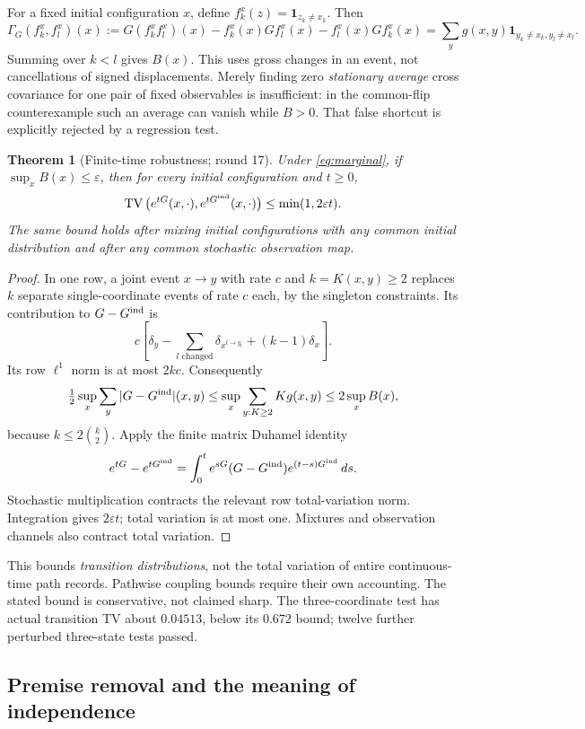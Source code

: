 \documentclass[11pt,a4paper]{article}
\newtheorem{theorem}{Theorem}
\newcommand{\TV}{\operatorname{TV}}
\begin{document}
For a fixed initial configuration $x$, define
$f_k^x(z)=\mathbf1_{z_k\ne x_k}$. Then
\[
 \Gamma_G(f_k^x,f_l^x)(x)
 :=G(f_k^xf_l^x)(x)-f_k^x(x)Gf_l^x(x)-f_l^x(x)Gf_k^x(x)
 =\sum_y g(x,y)\mathbf1_{y_k\ne x_k,y_l\ne x_l}.
\]
Summing over $k<l$ gives $B(x)$. This uses gross changes in an event, not
cancellations of signed displacements. Merely finding zero \emph{stationary
average} cross covariance for one pair of fixed observables is insufficient:
in the common-flip counterexample such an average can vanish while $B>0$.
That false shortcut is explicitly rejected by a regression test.

\begin{theorem}[Finite-time robustness; round 17]
Under \eqref{eq:marginal}, if $\sup_xB(x)\le\varepsilon$, then for every
initial configuration and $t\ge0$,
\[
 \TV\big(e^{tG}(x,\cdot),e^{tG^{\rm ind}}(x,\cdot)\big)
 \le\min(1,2\varepsilon t).
\]
The same bound holds after mixing initial configurations with any common
initial distribution and after any common stochastic observation map.
\end{theorem}
\begin{proof}
In one row, a joint event $x\to y$ with rate $c$ and $k=K(x,y)\ge2$
replaces $k$ separate single-coordinate events of rate $c$ each, by the
singleton constraints. Its contribution to $G-G^{\rm ind}$ is
\[
 c\left[\delta_y-\sum_{l\text{ changed}}\delta_{x^{l\to y_l}}
                       +(k-1)\delta_x\right].
\]
Its row $\ell^1$ norm is at most $2kc$. Consequently
\[
 \tfrac12\sup_x\sum_y|G-G^{\rm ind}|(x,y)
 \le\sup_x\sum_{y:K\ge2}K g(x,y)
 \le2\sup_x B(x),
\]
because $k\le2\binom{k}{2}$. Apply the finite matrix Duhamel identity
\[
 e^{tG}-e^{tG^{\rm ind}}
 =\int_0^t e^{sG}(G-G^{\rm ind})e^{(t-s)G^{\rm ind}}\,ds.
\]
Stochastic multiplication contracts the relevant row total-variation norm.
Integration gives $2\varepsilon t$; total variation is at most one.
Mixtures and observation channels also contract total variation.
\end{proof}

This bounds \emph{transition distributions}, not the total variation of
entire continuous-time path records. Pathwise coupling bounds require their
own accounting. The stated bound is conservative, not claimed sharp. The
three-coordinate test has actual transition TV about $0.04513$, below its
$0.672$ bound; twelve further perturbed three-state tests passed.

\subsection{Premise removal and the meaning of independence}
\end{document}
